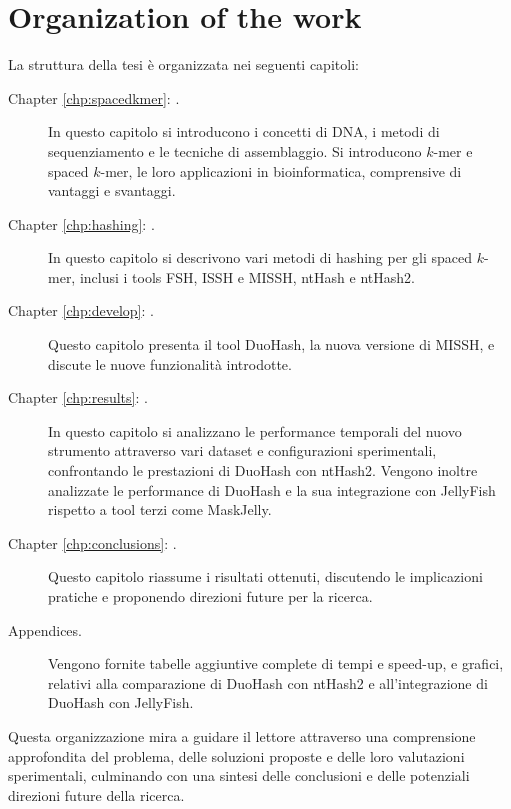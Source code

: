 \section{Organization of the work}
\label{sec:thesis-organization}

La struttura della tesi è organizzata nei seguenti capitoli:

\begin{description}
	\item[Chapter \ref{chp:spacedkmer}: .] In questo capitolo si introducono i concetti di DNA, i metodi di sequenziamento e le tecniche di assemblaggio. Si introducono $k$-mer e spaced $k$-mer, le loro applicazioni in bioinformatica, comprensive di vantaggi e svantaggi.
	\item[Chapter \ref{chp:hashing}: .] In questo capitolo si descrivono vari metodi di hashing per gli spaced $k$-mer, inclusi i tools \ac{FSH}, \ac{ISSH} e \ac{MISSH}, ntHash e ntHash2.
	\item[Chapter \ref{chp:develop}: .] Questo capitolo presenta il tool DuoHash, la nuova versione di MISSH, e discute le nuove funzionalità introdotte.
	\item[Chapter \ref{chp:results}: .] In questo capitolo si analizzano le performance temporali del nuovo strumento attraverso vari dataset e configurazioni sperimentali, confrontando le prestazioni di DuoHash con ntHash2. Vengono inoltre analizzate le performance di DuoHash e la sua integrazione con JellyFish rispetto a tool terzi come MaskJelly.
	\item[Chapter \ref{chp:conclusions}: .] Questo capitolo riassume i risultati ottenuti, discutendo le implicazioni pratiche e proponendo direzioni future per la ricerca.
	\item[Appendices.] Vengono fornite tabelle aggiuntive complete di tempi e speed-up, e grafici, relativi alla comparazione di DuoHash con ntHash2 e all'integrazione di DuoHash con JellyFish.
\end{description}

Questa organizzazione mira a guidare il lettore attraverso una comprensione approfondita del problema, delle soluzioni proposte e delle loro valutazioni sperimentali, culminando con una sintesi delle conclusioni e delle potenziali direzioni future della ricerca.